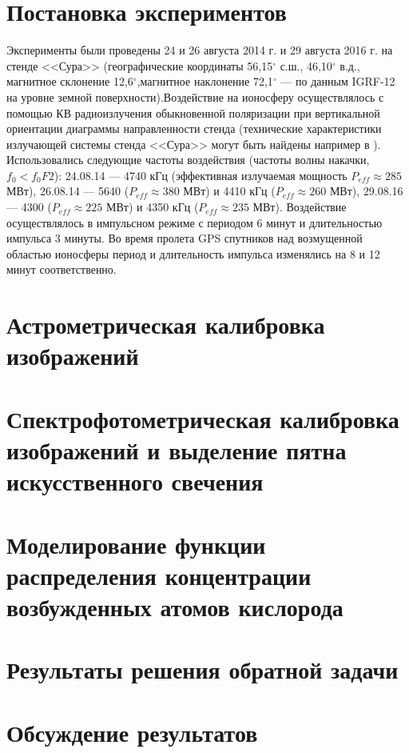 \documentclass[12pt,a4paper]{article}
\begin{document}
\section{Постановка экспериментов} \label{sec:exp_setup}
Эксперименты были проведены 24 и 26 августа 2014 г. и 29 августа 2016 г. на стенде <<Сура>> (географические координаты 56,15$^{\circ}$ с.ш., 46,10$^{\circ}$ в.д., магнитное склонение 12,6$^{\circ}$,магнитное наклонение 72,1$^{\circ}$ --- по данным IGRF-12 \cite{Thebault2015} на уровне земной поверхности).Воздействие на ионосферу осуществлялось с помощью КВ радиоизлучения обыкновенной поляризации при вертикальной ориентации диаграммы направленности стенда (технические характеристики излучающей системы стенда <<Сура>> могут быть найдены например в \cite{BERNHARDTSCALESGRACHEtAl1991}). Использовались следующие частоты воздействия (частоты волны накачки, $f_0<f_{0}F2$): 24.08.14 --- 4740 кГц (эффективная излучаемая мощность $P_{eff} \approx 285$ МВт), 26.08.14 --- 5640 ($P_{eff} \approx 380$ МВт) и 4410 кГц ($P_{eff} \approx 260$ МВт), 29.08.16 --- 4300 ($P_{eff} \approx 225$ МВт) и 4350 кГц ($P_{eff} \approx 235$ МВт). Воздействие осуществлялось в импульсном режиме с периодом 6 минут и длительностью импульса 3 минуты. Во время пролета GPS спутников над возмущенной областью ионосферы период и длительность импульса изменялись на 8 и 12 минут соответственно.

\section{Астрометрическая калибровка изображений} \label{sec:astro_cal}

\section{Спектрофотометрическая калибровка изображений и выделение пятна искусственного свечения} \label{sec:spectro_cal}

\section{Моделирование функции распределения концентрации возбужденных атомов кислорода} \label{sec:modelling}

\section{Результаты решения обратной задачи} \label{sec:inv_problem_results}

\section{Обсуждение результатов} \label{sec:discuss}



\end{document}
